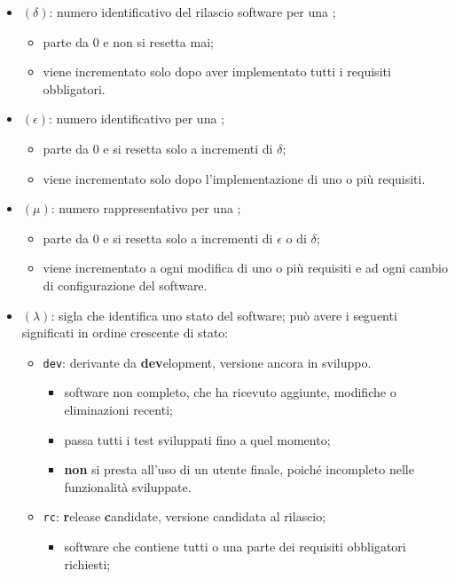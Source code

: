 		\begin{itemize}
			\item \((\delta)\): numero identificativo del rilascio software per una ;
			\begin{itemize}
				\item parte da 0 e non si resetta mai;
				\item viene incrementato solo dopo aver implementato tutti i requisiti obbligatori.
			\end{itemize}
			\item \((\epsilon)\): numero identificativo per una ;
			\begin{itemize}
				\item parte da 0 e si resetta solo a incrementi di \(\delta\);
				\item viene incrementato solo dopo l'implementazione di uno o più requisiti.
			\end{itemize}
			\item \((\mu)\): numero rappresentativo per una ;
			\begin{itemize}
				\item parte da 0 e si resetta solo a incrementi di \(\epsilon\) o di \(\delta\);
				\item viene incrementato a ogni modifica di uno o più requisiti e ad ogni cambio di configurazione del software.
			\end{itemize}
			\item \((\lambda)\): sigla che identifica uno stato del software; può avere i seguenti significati in ordine crescente di stato:
			\begin{itemize}
				\item \verb!dev!: derivante da \textbf{dev}elopment, versione ancora in sviluppo.
					\begin{itemize}
						\item software non completo, che ha ricevuto aggiunte, modifiche o eliminazioni recenti;
						\item passa tutti i test sviluppati fino a quel momento;
						\item \textbf{non} si presta all'uso di un utente finale, poiché incompleto nelle funzionalità sviluppate.
					\end{itemize}
				\item \verb!rc!: \textbf{r}elease \textbf{c}andidate, versione candidata al rilascio;
				\begin{itemize}
					\item software che contiene tutti o una parte dei requisiti obbligatori richiesti;

\end{itemize}
\end{itemize}
\end{itemize}
